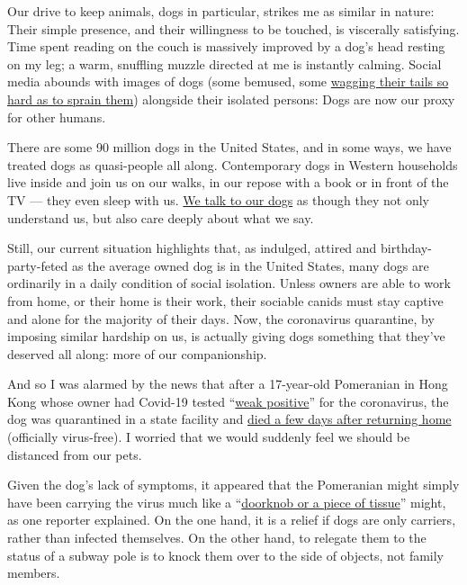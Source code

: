 Our drive to keep animals, dogs in particular, strikes me as similar in
nature: Their simple presence, and their willingness to be touched, is
viscerally satisfying. Time spent reading on the couch is massively
improved by a dog's head resting on my leg; a warm, snuffling muzzle
directed at me is instantly calming. Social media abounds with images of
dogs (some bemused, some
\href{https://twitter.com/Emmasmith77xx/status/1240952373113208832?s=20}{wagging
their tails so hard as to sprain them}) alongside their isolated
persons: Dogs are now our proxy for other humans.

There are some 90 million dogs in the United States, and in some ways,
we have treated dogs as quasi-people all along. Contemporary dogs in
Western households live inside and join us on our walks, in our repose
with a book or in front of the TV --- they even sleep with us.
\href{https://www.nytimes.com/2019/08/02/opinion/sunday/talking-dog.html}{We
talk to our dogs} as though they not only understand us, but also care
deeply about what we say.

Still, our current situation highlights that, as indulged, attired and
birthday-party-feted as the average owned dog is in the United States,
many dogs are ordinarily in a daily condition of social isolation.
Unless owners are able to work from home, or their home is their work,
their sociable canids must stay captive and alone for the majority of
their days. Now, the coronavirus quarantine, by imposing similar
hardship on us, is actually giving dogs something that they've deserved
all along: more of our companionship.

And so I was alarmed by the news that after a 17-year-old Pomeranian in
Hong Kong whose owner had Covid-19 tested
``\href{https://www.scmp.com/news/hong-kong/health-environment/article/3075650/first-dog-found-coronavirus-has-died-after}{weak
positive}'' for the coronavirus, the dog was quarantined in a state
facility and
\href{https://coconuts.co/hongkong/news/hong-kong-pomeranian-that-tested-positive-for-covid-19-dies-after-returning-home/}{died
a few days after returning home} (officially virus-free). I worried that
we would suddenly feel we should be distanced from our pets.

Given the dog's lack of symptoms, it appeared that the Pomeranian might
simply have been carrying the virus much like a
``\href{https://www.scmp.com/news/hong-kong/article/3053026/careful-you-can-still-catch-coronavirus-your-dog-even-if-it-not?utm_medium=email\&utm_source=mailchimp\&utm_campaign=enlz-OpinionDaily\&utm_content=20200301\&MCUID=e0a9ed7cd8\&MCCampaignID=5f452d4331\&}{doorknob
or a piece of tissue}'' might, as one reporter explained. On the one
hand, it is a relief if dogs are only carriers, rather than infected
themselves. On the other hand, to relegate them to the status of a
subway pole is to knock them over to the side of objects, not family
members.

